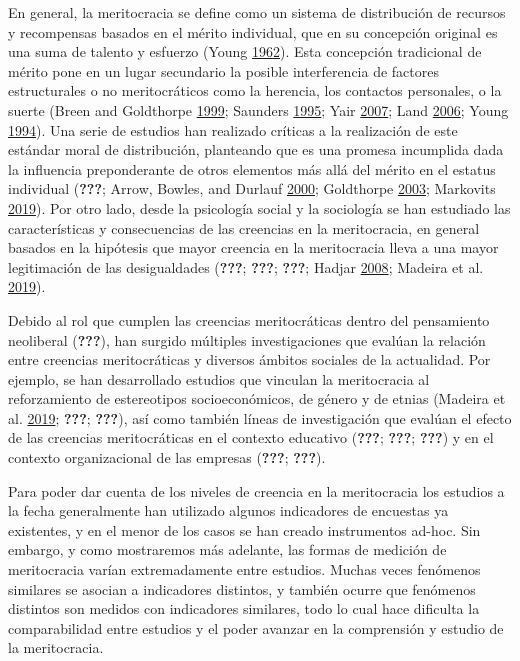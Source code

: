 \documentclass[
]{article}
\begin{document}
En general, la meritocracia se define como un sistema de distribución de
recursos y recompensas basados en el mérito individual, que en su
concepción original es una suma de talento y esfuerzo (Young
\protect\hyperlink{ref-young_rise_1962}{1962}). Esta concepción
tradicional de mérito pone en un lugar secundario la posible
interferencia de factores estructurales o no meritocráticos como la
herencia, los contactos personales, o la suerte (Breen and Goldthorpe
\protect\hyperlink{ref-breenClassInequalityMeritocracy1999}{1999};
Saunders \protect\hyperlink{ref-saundersMightBritainBe1995}{1995}; Yair
\protect\hyperlink{ref-yairMeritocracy2007}{2007}; Land
\protect\hyperlink{ref-landWeSatTable2006}{2006}; Young
\protect\hyperlink{ref-youngRiseMeritocracy1994}{1994}). Una serie de
estudios han realizado críticas a la realización de este estándar moral
de distribución, planteando que es una promesa incumplida dada la
influencia preponderante de otros elementos más allá del mérito en el
estatus individual ({\textbf{???}}; Arrow, Bowles, and Durlauf
\protect\hyperlink{ref-arrow_meritocracy_2000}{2000}; Goldthorpe
\protect\hyperlink{ref-goldthorpe_myth_2003}{2003}; Markovits
\protect\hyperlink{ref-markovits_Meritocracy_2019}{2019}). Por otro
lado, desde la psicología social y la sociología se han estudiado las
características y consecuencias de las creencias en la meritocracia, en
general basados en la hipótesis que mayor creencia en la meritocracia
lleva a una mayor legitimación de las desigualdades ({\textbf{???}};
{\textbf{???}}; {\textbf{???}}; Hadjar
\protect\hyperlink{ref-hadjar_meritokratie_2008}{2008}; Madeira et al.
\protect\hyperlink{ref-MadeiraPrimesConsequencesSystematic2019}{2019}).

Debido al rol que cumplen las creencias meritocráticas dentro del
pensamiento neoliberal ({\textbf{???}}), han surgido múltiples
investigaciones que evalúan la relación entre creencias meritocráticas y
diversos ámbitos sociales de la actualidad. Por ejemplo, se han
desarrollado estudios que vinculan la meritocracia al reforzamiento de
estereotipos socioeconómicos, de género y de etnias (Madeira et al.
\protect\hyperlink{ref-MadeiraPrimesConsequencesSystematic2019}{2019};
{\textbf{???}}; {\textbf{???}}), así como también líneas de
investigación que evalúan el efecto de las creencias meritocráticas en
el contexto educativo ({\textbf{???}}; {\textbf{???}}; {\textbf{???}}) y
en el contexto organizacional de las empresas ({\textbf{???}};
{\textbf{???}}).

Para poder dar cuenta de los niveles de creencia en la meritocracia los
estudios a la fecha generalmente han utilizado algunos indicadores de
encuestas ya existentes, y en el menor de los casos se han creado
instrumentos ad-hoc. Sin embargo, y como mostraremos más adelante, las
formas de medición de meritocracia varían extremadamente entre estudios.
Muchas veces fenómenos similares se asocian a indicadores distintos, y
también ocurre que fenómenos distintos son medidos con indicadores
similares, todo lo cual hace dificulta la comparabilidad entre estudios
y el poder avanzar en la comprensión y estudio de la meritocracia.
\end{document}
